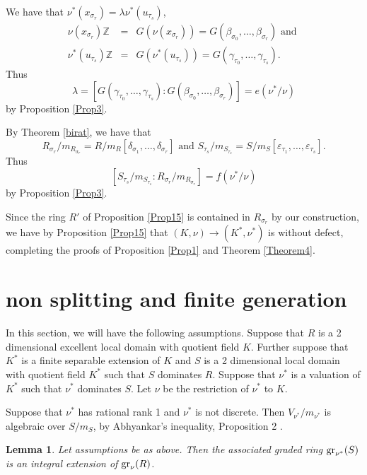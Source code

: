 \documentclass[11pt]{amsart}
\def\NZQ{\mathbb}               %
\def\ZZ{{\NZQ Z}}
\newtheorem{Lemma}[Theorem]{Lemma}
\let\epsilon\varepsilon
\begin{document}
We have that $\nu^*(x_{\sigma_r})=\lambda\nu^*(u_{\tau_s})$,
$$
\begin{array}{lll}
\nu(x_{\sigma_r})\ZZ&=&G(\nu(x_{\sigma_r}))=G(\beta_{\sigma_0},\ldots,\beta_{\sigma_r})\mbox{ and }\\
\nu^*(u_{\tau_s})\ZZ&=&G(\nu^*(u_{\tau_s}))=G(\gamma_{\tau_0},\ldots,\gamma_{\tau_s}).
\end{array}
$$
Thus 
$$
\lambda=[G(\gamma_{\tau_0},\ldots,\gamma_{\tau_s}):G(\beta_{\sigma_0},\ldots,\beta_{\sigma_r})]=e(\nu^*/\nu)
$$
by Proposition \ref{Prop3}.

By Theorem \ref{birat}, we have that
$$
R_{\sigma_r}/m_{R_{\sigma_r}}=R/m_R[\delta_{\sigma_1},\ldots,\delta_{\sigma_r}]\mbox{ and }S_{\tau_s}/m_{S_{\tau_s}}=S/m_S[\epsilon_{\tau_1},\ldots,\epsilon_{\tau_s}].
$$
Thus
$$
[S_{\tau_s}/m_{S_{\tau_s}}:R_{\sigma_r}/m_{R_{\sigma_r}}]=f(\nu^*/\nu)
$$
by Proposition \ref{Prop3}.



Since the ring $R'$ of Proposition \ref{Prop15} is contained in $R_{\sigma_r}$ by our construction, we have  by Proposition \ref{Prop15} that $(K,\nu)\rightarrow (K^*,\nu^*)$ is without defect, completing the proofs of Proposition \ref{Prop1} and Theorem \ref{Theorem4}.

\section{non splitting and finite generation}


In this section, we will have the following assumptions. Suppose that $R$ is a 2 dimensional excellent local domain with quotient field $K$. Further suppose that $K^*$ is a finite separable extension of $K$ and $S$ is a 2 dimensional local domain with quotient field
$K^*$ such that  $S$ dominates $R$. 
Suppose that $\nu^*$ is a valuation of $K^*$ such that 
 $\nu^*$ dominates $S$. Let $\nu$ be the restriction of $\nu^*$ to $K$. 
 
 Suppose that $\nu^*$ has rational rank 1 and $\nu^*$ is not discrete.  Then $V_{\nu^*}/m_{\nu^*}$ is algebraic over $S/m_S$, by Abhyankar's inequality, Proposition 2 \cite{Ab1}. 
 
 \begin{Lemma} \label{LemmaN1} Let assumptions be as above. Then the associated graded ring ${\rm gr}_{\nu^*}(S)$ is an integral extension of ${\rm gr}_{\nu}(R)$.
 \end{Lemma}
 
\end{document}

